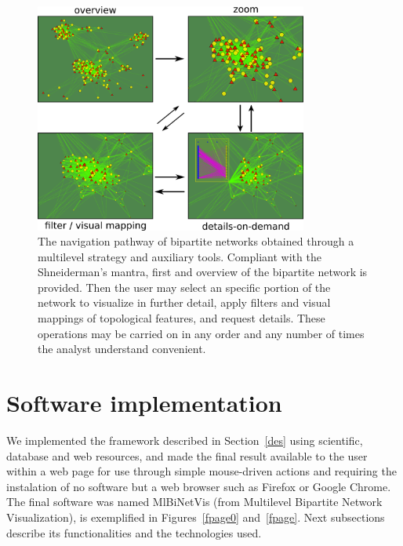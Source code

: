 \documentclass[runningheads]{llncs}
\begin{document}
\begin{figure}[!h]\centering
 \includegraphics[width=0.8\textwidth]{fnav___}
  \caption{The navigation pathway of bipartite networks obtained through a multilevel strategy
  and auxiliary tools.
  Compliant with the Shneiderman's mantra, first and overview of the bipartite network is provided.
  Then the user may select an specific portion of the network to visualize in further detail,
  apply filters and visual mappings of topological features, and request details.
  These operations may be carried on in any order and any number of times the analyst understand convenient.
  }\label{fnav}
\end{figure}

\noindent 
\section{Software implementation}\label{sof}
We implemented the framework described in Section~\ref{des} using scientific,
database and web resources,
and made the final result available to the user within a web page
for use through simple mouse-driven actions
and requiring the instalation of no software but a web browser such as Firefox or Google Chrome.
The final software was named MlBiNetVis (from Multilevel Bipartite Network Visualization),
is exemplified in Figures~\ref{fpage0} and~\ref{fpage}.
Next subsections describe its functionalities and the technologies used.
\end{document}
